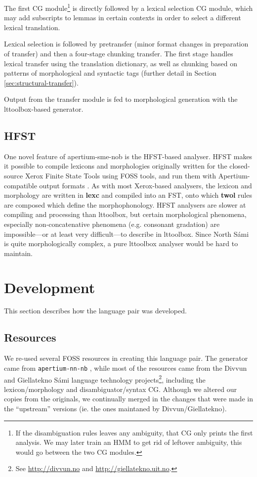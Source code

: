 \documentclass{book}
\begin{document}
The first CG module\footnote{If the disambiguation rules leaves any
  ambiguity, that CG only prints the first analysis. We may later
  train an HMM to get rid of leftover ambiguity, this would go between
  the two CG modules.} is directly followed by a lexical selection CG
module, which may add subscripts to lemmas in certain contexts in
order to select a different lexical translation.

Lexical selection is followed by pretransfer (minor format changes in
preparation of transfer) and then a four-stage chunking transfer. The
first stage handles lexical transfer using the translation dictionary,
as well as chunking based on patterns of morphological and syntactic
tags (further detail in Section \ref{sec:structural-transfer}).

Output from the transfer module is fed to morphological generation
with the lttoolbox-based \nob{} generator.

\subsection{HFST}
\label{sec:hfst}
One novel feature of apertium-sme-nob is the HFST-based analyser. HFST
makes it possible to compile lexicons and morphologies originally
written for the closed-source Xerox Finite State Tools using FOSS
tools, and run them with Apertium-compatible output formats
\citep{pirinen2011compiling}. As with most Xerox-based analysers, the
\sme{} lexicon and morphology are written in \textbf{lexc} and
compiled into an FST, onto which \textbf{twol} rules are composed
which define the morphophonology. HFST analysers are slower at
compiling and processing than lttoolbox, but certain morphological
phenomena, especially non-concatenative phenomena (e.g. \sme{}
consonant gradation) are impossible---or at least very difficult---to
describe in lttoolbox. Since North S\'{a}mi is quite morphologically
complex, a pure lttoolbox analyser would be hard to maintain.


\section{Development}
  \label{sec:development}

This section describes how the language pair was developed.
\subsection{Resources}
We re-used several FOSS resources in creating this language pair. The
\nob{} generator came from {\tt apertium-nn-nb}
\citep{unhammer2009rfr}, while most of the \sme{} resources came from
the Divvun and Giellatekno S\'{a}mi language technology
projects\footnote{See \href{http://divvun.no}{http://divvun.no} and
  \href{http://giellatekno.uit.no}{http://giellatekno.uit.no}.},
including the lexicon/morphology and disambiguator/syntax CG. Although
we altered our copies from the originals, we continually merged in the
changes that were made in the ``upstream'' versions (ie. the ones
maintaned by Divvun/Giellatekno).
\end{document}
